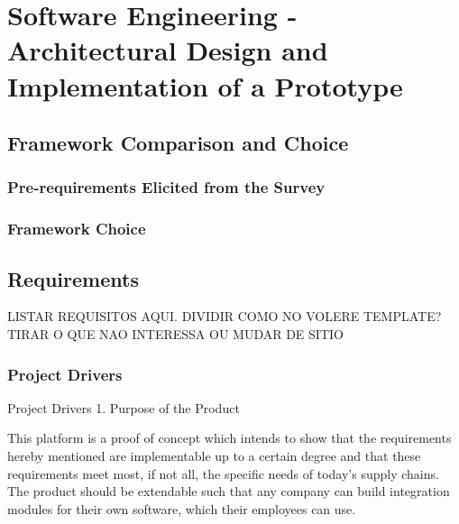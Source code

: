 \chapter{Software Engineering - Architectural Design and Implementation of a Prototype}
\label{chap:prototype}
\minitoc \mtcskip \noindent 


\section{Framework Comparison and Choice}
\subsection{Pre-requirements Elicited from the Survey}

\subsection{Framework Choice}



\section{Requirements}

LISTAR REQUISITOS AQUI. DIVIDIR COMO NO VOLERE TEMPLATE? TIRAR O QUE NAO INTERESSA OU MUDAR DE SITIO



\subsection{Project Drivers}

Project Drivers
	1. Purpose of the Product

	This platform is a proof of concept which intends to show that the requirements hereby mentioned are implementable up to a certain degree and that these requirements meet most, if not all, the specific needs of today's supply chains. The product should be extendable such that any company can build integration modules for their own software, which their employees can use.
	
